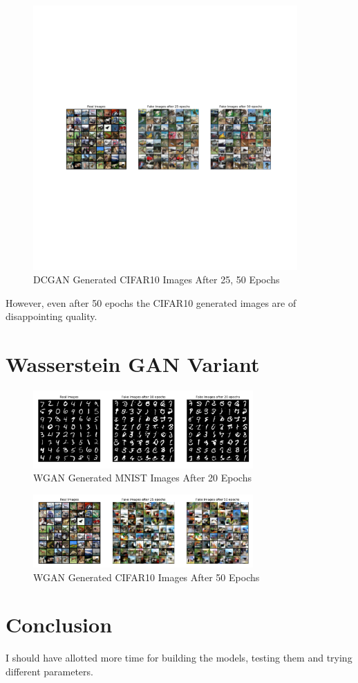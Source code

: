 \documentclass[letterpaper, 10pt]{article}
\begin{document}
\begin{figure}[h]
 \caption{DCGAN Generated CIFAR10 Images After 25, 50 Epochs}
 \centering
 \includegraphics[width=0.9\textwidth]{cifar10_gan_real_v_fake_50_epochs}
\end{figure}

However, even after 50 epochs the CIFAR10 generated images are of disappointing quality.

\newpage

\section{Wasserstein GAN Variant}

\begin{figure}[h]
 \caption{WGAN Generated MNIST Images After 20 Epochs}
 \centering
 \includegraphics[width=0.75\textwidth]{mnist_wgan_real_v_fake_20_epochs}
\end{figure}

\begin{figure}[h]
 \caption{WGAN Generated CIFAR10 Images After 50 Epochs}
 \centering
 \includegraphics[width=0.75\textwidth]{cifar10_wgan_real_v_fake_50_epochs}
\end{figure}

\newpage

\section{Conclusion}

I should have allotted more time for building the models, testing them and trying
different parameters.

\newpage


\end{document}
